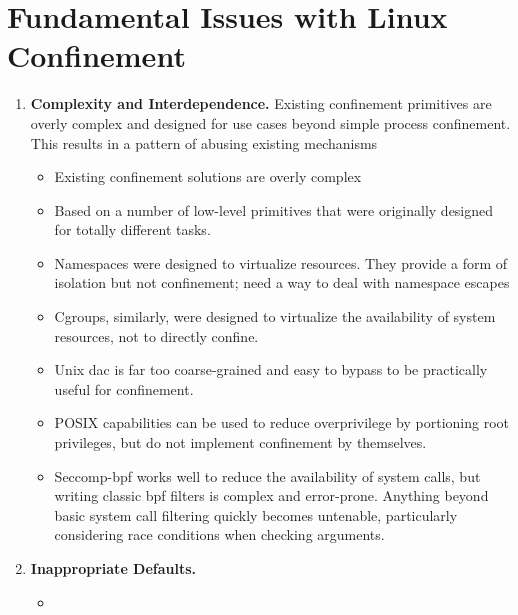 \section{Fundamental Issues with Linux Confinement}%
\label{s:cp-confinement-issues}

\begin{enumerate}
  \item \textbf{Complexity and Interdependence.}
    Existing confinement primitives are overly complex and designed for use
    cases beyond simple process confinement. This results in a pattern of
    abusing existing mechanisms
  \begin{inprogress}
    \begin{itemize}
      \item Existing confinement solutions are overly complex
      \item Based on a number of low-level primitives that were originally designed for
            totally different tasks.
      \item Namespaces were designed to virtualize resources. They provide a form of
            isolation but not confinement; need a way to deal with namespace escapes
      \item Cgroups, similarly, were designed to virtualize the availability of system
            resources, not to directly confine.
      \item Unix \gls{dac} is far too coarse-grained and easy to bypass to be practically useful for confinement.
      \item POSIX capabilities can be used to reduce overprivilege by portioning root privileges, but do not
            implement confinement by themselves.
      \item Seccomp-bpf works well to reduce the availability of system calls, but writing
            classic \gls{bpf} filters is complex and error-prone. Anything beyond basic system call
            filtering quickly becomes untenable, particularly considering race conditions when
            checking arguments.
    \end{itemize}
  \end{inprogress}

  \item \textbf{Inappropriate Defaults.}
  \begin{inprogress}
    \begin{itemize}
      \item
    \end{itemize}
  \end{inprogress}


\end{enumerate}
